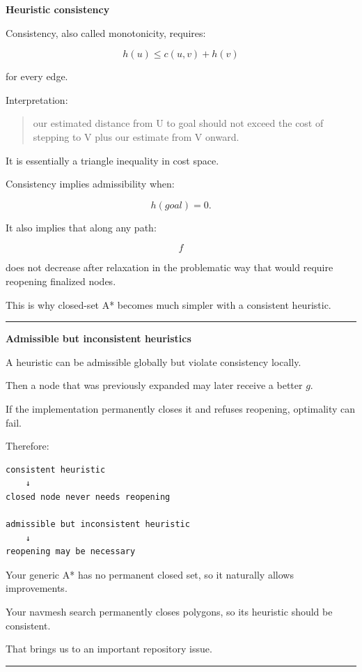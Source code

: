 \textbf{Heuristic consistency}

Consistency, also called monotonicity, requires:

\[
\boxed{
h(u)
\le
c(u,v)+h(v)
}
\]

for every edge.

Interpretation:

\begin{quote}
our estimated distance from U to goal should not exceed the cost of stepping to V plus our estimate from V onward.
\end{quote}

It is essentially a triangle inequality in cost space.

Consistency implies admissibility when:

\[
h(goal)=0.
\]

It also implies that along any path:

\[
f
\]

does not decrease after relaxation in the problematic way that would require reopening finalized nodes.

This is why closed-set A* becomes much simpler with a consistent heuristic.

\begin{center}\rule{0.5\linewidth}{0.5pt}\end{center}

\textbf{Admissible but inconsistent heuristics}

A heuristic can be admissible globally but violate consistency locally.

Then a node that was previously expanded may later receive a better \(g\).

If the implementation permanently closes it and refuses reopening, optimality can fail.

Therefore:

\begin{verbatim}
consistent heuristic
    ↓
closed node never needs reopening

admissible but inconsistent heuristic
    ↓
reopening may be necessary
\end{verbatim}

Your generic A* has no permanent closed set, so it naturally allows improvements.

Your navmesh search permanently closes polygons, so its heuristic should be consistent.

That brings us to an important repository issue.

\begin{center}\rule{0.5\linewidth}{0.5pt}\end{center}

